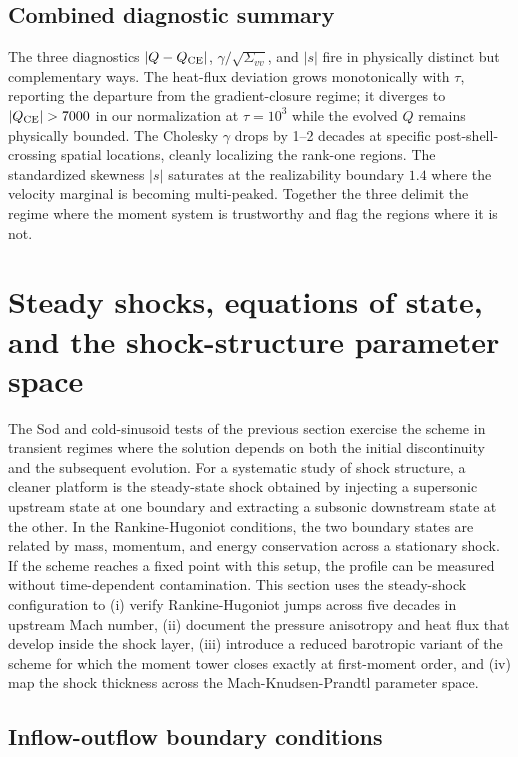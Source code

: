 \documentclass[11pt,letterpaper]{article}
\begin{document}
\subsection{Combined diagnostic summary}

The three diagnostics $|Q - Q_{\rm CE}|$, $\gamma/\sqrt{\Sigma_{vv}}$, and $|s|$ fire in physically distinct but complementary ways. The heat-flux deviation grows monotonically with $\tau$, reporting the departure from the gradient-closure regime; it diverges to $|Q_{\rm CE}| > 7000$ in our normalization at $\tau = 10^3$ while the evolved $Q$ remains physically bounded. The Cholesky $\gamma$ drops by 1--2 decades at specific post-shell-crossing spatial locations, cleanly localizing the rank-one regions. The standardized skewness $|s|$ saturates at the realizability boundary $1.4$ where the velocity marginal is becoming multi-peaked. Together the three delimit the regime where the moment system is trustworthy and flag the regions where it is not.

\section{Steady shocks, equations of state, and the shock-structure parameter space}
\label{sec:shocks}

The Sod and cold-sinusoid tests of the previous section exercise the scheme in transient regimes where the solution depends on both the initial discontinuity and the subsequent evolution. For a systematic study of shock structure, a cleaner platform is the steady-state shock obtained by injecting a supersonic upstream state at one boundary and extracting a subsonic downstream state at the other. In the Rankine-Hugoniot conditions, the two boundary states are related by mass, momentum, and energy conservation across a stationary shock. If the scheme reaches a fixed point with this setup, the profile can be measured without time-dependent contamination. This section uses the steady-shock configuration to (i) verify Rankine-Hugoniot jumps across five decades in upstream Mach number, (ii) document the pressure anisotropy and heat flux that develop inside the shock layer, (iii) introduce a reduced barotropic variant of the scheme for which the moment tower closes exactly at first-moment order, and (iv) map the shock thickness across the Mach-Knudsen-Prandtl parameter space.

\subsection{Inflow-outflow boundary conditions}
\end{document}
